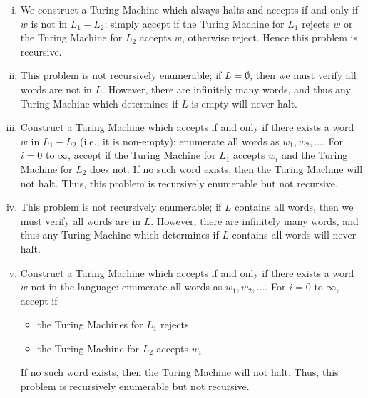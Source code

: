 \begin{enumerate}[1.]
\begin{enumerate}[a.]
\begin{enumerate}[i.]
            \item We construct a Turing Machine which always halts and accepts if and only if \(w\) is not in \(L_1 - L_2\): simply accept if the Turing Machine for \(L_1\) rejects \(w\) or the Turing Machine for \(L_2\) accepts \(w\), otherwise reject. Hence this problem is recursive. 
            \item This problem is not recursively enumerable; if \(L = \emptyset \), then we must verify all words are not in \(L\). However, there are infinitely many words, and thus any Turing Machine which determines if \(L\) is empty will never halt. 
            \item Construct a Turing Machine which accepts if and only if there exists a word \(w\) in \(L_1 - L_2\) (i.e., it is non-empty): enumerate all words as \(w_1, w_2, \hdots \). For \(i=0\) to \(\infty \), accept if the Turing Machine for \(L_1\) accepts \(w_i\) and the Turing Machine for \(L_2\) does not. If no such word exists, then the Turing Machine will not halt. Thus, this problem is recursively enumerable but not recursive.
            \item This problem is not recursively enumerable; if \(L\) contains all words, then we must verify all words are in \(L\). However, there are infinitely many words, and thus any Turing Machine which determines if \(L\) contains all words will never halt. 
            \item Construct a Turing Machine which accepts if and only if there exists a word \(w\) not in the language: enumerate all words as \(w_1, w_2, \hdots \). For \(i=0\) to \(\infty \), accept if 
            \begin{itemize}
                \item the Turing Machines for \(L_1\) rejects
                \item the Turing Machine for \(L_2\) accepts \(w_i\). 
            \end{itemize}
                If no such word exists, then the Turing Machine will not halt. Thus, this problem is recursively enumerable but not recursive.
        \end{enumerate}
    \end{enumerate}


\end{enumerate}
